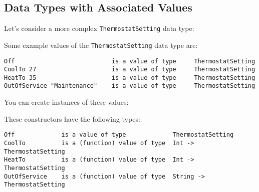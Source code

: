 \hypertarget{data-types-with-associated-values}{%
\subsection{Data Types with Associated
Values}\label{data-types-with-associated-values}}

Let's consider a more complex \texttt{ThermostatSetting} data type:

\begin{Shaded}
\begin{Highlighting}[]
  
\OtherTok{=}  
    \OperatorTok{|}   
    \OperatorTok{|}  
    \OperatorTok{|}  
    \NormalTok{ (}\NormalTok{, }\NormalTok{)}
\end{Highlighting}
\end{Shaded}

Some example values of the \texttt{ThermostatSetting} data type are:

\begin{verbatim}
Off                           is a value of type     ThermostatSetting
CoolTo 27                     is a value of type     ThermostatSetting
HeatTo 35                     is a value of type     ThermostatSetting
OutOfService "Maintenance"    is a value of type     ThermostatSetting
\end{verbatim}

You can create instances of these values:

\begin{Shaded}
\begin{Highlighting}[]
\OtherTok{=} 
\OtherTok{=}  
\OtherTok{=}  
\end{Highlighting}
\end{Shaded}

These constructors have the following types:

\begin{verbatim}
Off             is a value of type             ThermostatSetting
CoolTo          is a (function) value of type  Int -> ThermostatSetting
HeatTo          is a (function) value of type  Int -> ThermostatSetting
OutOfService    is a (function) value of type  String -> ThermostatSetting
\end{verbatim}

